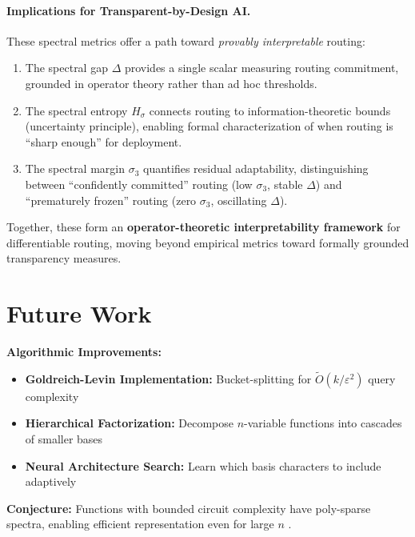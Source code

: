 \documentclass[Royal,times,sageh]{sagej}
\begin{document}
\paragraph{Implications for Transparent-by-Design AI.}

These spectral metrics offer a path toward \textit{provably interpretable} routing:
\begin{enumerate}
    \item The spectral gap $\Delta$ provides a single scalar measuring routing commitment, grounded in operator theory rather than ad hoc thresholds.
    \item The spectral entropy $H_\sigma$ connects routing to information-theoretic bounds (uncertainty principle), enabling formal characterization of when routing is ``sharp enough'' for deployment.
    \item The spectral margin $\sigma_3$ quantifies residual adaptability, distinguishing between ``confidently committed'' routing (low $\sigma_3$, stable $\Delta$) and ``prematurely frozen'' routing (zero $\sigma_3$, oscillating $\Delta$).
\end{enumerate}
Together, these form an \textbf{operator-theoretic interpretability framework} for differentiable routing, moving beyond empirical metrics toward formally grounded transparency measures.

\section{Future Work}
\label{sec:future}

\begin{tcolorbox}[colback=gray!10, colframe=gray!50, title=Remaining Challenges]
\textbf{Algorithmic Improvements:}
\begin{itemize}
    \item \textbf{Goldreich-Levin Implementation:} Bucket-splitting for $\tilde{O}(k/\varepsilon^2)$ query complexity
    \item \textbf{Hierarchical Factorization:} Decompose $n$-variable functions into cascades of smaller bases
    \item \textbf{Neural Architecture Search:} Learn which basis characters to include adaptively
\end{itemize}

\textbf{Conjecture:} Functions with bounded circuit complexity have poly-sparse spectra, enabling efficient representation even for large $n$ \cite{kushilevitz1993learning}.
\end{tcolorbox}
\end{document}
